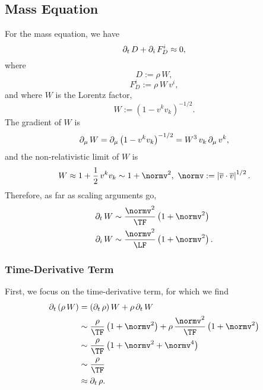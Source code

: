 \subsection{Mass Equation}

For the mass equation, we have
\begin{equation}
  \partial_{t}\,D+\partial_{i}\,F^{i}_{D}\approx0,
\end{equation}
where
\begin{equation}
  D:=\rho\,W,
\end{equation}
\begin{equation}
  F^{i}_{D}:=\rho\,W\,v^{i},
\end{equation}
and where $W$ is the Lorentz factor,
\begin{equation}
  W:=\left(1-v^{k}v_{k}\right)^{-1/2}.
\end{equation}
The gradient of $W$ is
\begin{equation}
  \partial_{\mu}\,W
  =\partial_{\mu}\left(1-v^{k}v_{k}\right)^{-1/2}
  =W^{3}\,v_{k}\,\partial_{\mu}\,v^{k},
\end{equation}
and the non-relativistic limit of $W$ is
\begin{equation}
  W\approx1+\frac{1}{2}\,v^{k}v_{k}\sim1+\normv^{2},
  \ \normv:=\left|\myol{v}\cdot\myol{v}\right|^{1/2}.
\end{equation}
Therefore, as far as scaling arguments go,
\begin{align}
  \p_{t}\,W&\sim\frac{\normv^{2}}{\TF}\left(1+\normv^{2}\right) \\
  \p_{i}\,W&\sim\frac{\normv^{2}}{\LF}\left(1+\normv^{2}\right).
\end{align}

\subsubsection{Time-Derivative Term}
First, we focus on the time-derivative term, for which we find
\begin{align}
  \p_{t}\left(\rho\,W\right)
  &=\left(\p_{t}\,\rho\right)W+\rho\,\p_{t}\,W \\
  &\sim\frac{\rho}{\TF}\left(1+\normv^{2}\right)
  +\rho\,\frac{\normv^{2}}{\TF}\left(1+\normv^{2}\right) \\
  &\sim\frac{\rho}{\TF}\left(1+\normv^{2}+\normv^{4}\right) \\
  &\sim\frac{\rho}{\TF} \\
  &\approx\p_{t}\,\rho.
  \label{NL.eq.rhoT}
\end{align}


